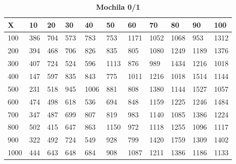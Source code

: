 \documentclass[10pt,letterpaper]{article}
\begin{document}
\newpage 
{}
\begin{center}
\begin{table}\renewcommand{\arraystretch}{2.5}
\caption{\large \textbf{Mochila 0/1}}
\centering
\begin{tabular} { |m{0.5cm}|m{1.3cm}|m{1.3cm}|m{1.3cm}|m{1.3cm}|m{1.3cm}|m{1.3cm}|m{1.3cm}|m{1.3cm}|m{1.3cm}|m{1.3cm}|} 
\hline
\rowcolor{Gray}
\centering \textbf{X} & \centering \textbf{10} & \centering \textbf{20} & \centering \textbf{30}\ & \centering \textbf{40} & \centering \textbf{50} & \centering \textbf{60}\ & \centering \textbf{70} & \centering \textbf{80} & \centering \textbf{90}\ & \textbf{100} \\\hline
\cellcolor{Gray}100 & \Large 386 & \Large 704 & \Large 573 & \Large 783 & \Large 753 & \Large 1171 & \Large 1052 & \Large 1068 & \Large 953 & \Large 1312 \\
\hline
\cellcolor{Gray}200 & \Large 394 & \Large 468 & \Large 706 & \Large 826 & \Large 835 & \Large 805 & \Large 1080 & \Large 1249 & \Large 1189 & \Large 1376 \\
\hline
\cellcolor{Gray}300 & \Large 407 & \Large 724 & \Large 524 & \Large 596 & \Large 1113 & \Large 876 & \Large 989 & \Large 1434 & \Large 1216 & \Large 1018 \\
\hline
\cellcolor{Gray}400 & \Large 147 & \Large 597 & \Large 835 & \Large 843 & \Large 775 & \Large 1011 & \Large 1216 & \Large 1018 & \Large 1514 & \Large 1144 \\
\hline
\cellcolor{Gray}500 & \Large 231 & \Large 518 & \Large 945 & \Large 1006 & \Large 881 & \Large 808 & \Large 1380 & \Large 1144 & \Large 1527 & \Large 1057 \\
\hline
\cellcolor{Gray}600 & \Large 474 & \Large 498 & \Large 618 & \Large 536 & \Large 694 & \Large 848 & \Large 1159 & \Large 1225 & \Large 1246 & \Large 1484 \\
\hline
\cellcolor{Gray}700 & \Large 347 & \Large 487 & \Large 699 & \Large 807 & \Large 819 & \Large 983 & \Large 1140 & \Large 1085 & \Large 1386 & \Large 1224 \\
\hline
\cellcolor{Gray}800 & \Large 502 & \Large 415 & \Large 647 & \Large 863 & \Large 1150 & \Large 972 & \Large 1118 & \Large 1255 & \Large 1096 & \Large 1117 \\
\hline
\cellcolor{Gray}900 & \Large 322 & \Large 492 & \Large 724 & \Large 549 & \Large 928 & \Large 799 & \Large 1420 & \Large 1759 & \Large 1309 & \Large 1402 \\
\hline
\cellcolor{Gray}1000 & \Large 444 & \Large 643 & \Large 648 & \Large 684 & \Large 908 & \Large 1087 & \Large 1211 & \Large 1386 & \Large 1186 & \Large 1133 \\
\hline
\end{tabular} \\
\end{table}
\end{center}
\end{document}
